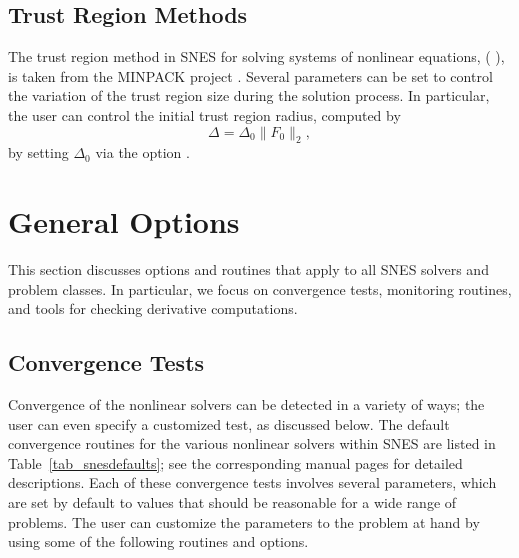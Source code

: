 \subsection{Trust Region Methods}

The trust region method in SNES for solving systems of nonlinear
equations,  ( ), is taken from
the MINPACK project \cite{more84}. Several parameters can be set to
control the variation of the trust region size during the solution
process.  In particular, the user can control the initial trust region
radius, computed by
\[
  \Delta = \Delta_0 \| F_0 \|_2,
\]
by setting $ \Delta_0 $ via the option 
.

\section{General Options}

This section discusses options and routines that apply to all SNES
solvers and problem classes.  In particular, we focus on convergence
tests, monitoring routines, and tools for checking derivative
computations.

\subsection{Convergence Tests}
\label{sec_snesconvergence}

Convergence of the nonlinear solvers can be detected in a variety of
ways; the user can even specify a customized test, as discussed
below.  The default convergence routines for
the various nonlinear solvers within SNES are listed in
Table~\ref{tab_snesdefaults}; see the corresponding manual pages for
detailed descriptions.  Each of these convergence tests involves
several parameters, which are set by default to values that should be
reasonable for a wide range of problems.  The user can customize the
parameters to the problem at hand by using some of the following
routines and options.

